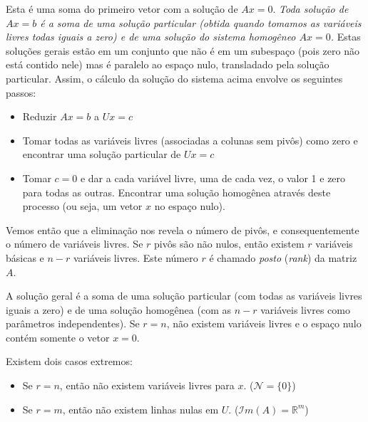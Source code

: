 Esta é uma soma do primeiro vetor com a solução de $Ax=0$. \emph{Toda solução de $Ax=b$ é a soma de uma solução particular (obtida quando tomamos as variáveis livres todas iguais a zero) e de uma solução do sistema homogêneo $Ax=0$.} Estas soluções gerais estão em um conjunto que não é em um subespaço (pois zero não está contido nele) mas é paralelo ao espaço nulo, transladado pela solução particular. Assim, o cálculo da solução do sistema acima envolve os seguintes passos:
\begin{itemize}
   \item Reduzir $Ax=b$ a $Ux=c$
   \item Tomar todas as variáveis livres (associadas a colunas sem pivôs) como zero e encontrar uma solução particular de $Ux=c$
   \item Tomar $c=0$ e dar a cada variável livre, uma de cada vez, o valor 1 e zero para todas as outras. Encontrar uma solução homogênea através deste processo (ou seja, um vetor $x$ no espaço nulo).
\end{itemize}

Vemos então que a eliminação nos revela o número de pivôs, e consequentemente o número de variáveis livres. Se $r$ pivôs são não nulos, então existem $r$ variáveis básicas e $n-r$ variáveis livres. Este número $r$ é chamado \emph{posto} (\emph{rank}) da matriz $A$.

\begin{center}
\end{center}

A solução geral é a soma de uma solução particular (com todas as variáveis livres iguais a zero) e de uma solução homogênea (com as $n-r$ variáveis livres como parâmetros independentes). Se $r=n$, não existem variáveis livres e o espaço nulo contém somente o vetor $x=0$.

Existem dois casos extremos:
\begin{itemize}
  \item Se $r=n$, então não existem variáveis livres para $x$. (${\mathcal{N}} = \{ 0\}$)
  \item Se $r=m$, então não existem linhas nulas em $U$. (${\mathcal{I}}m(A) = {\mathbb{R}}^m$)
\end{itemize}

